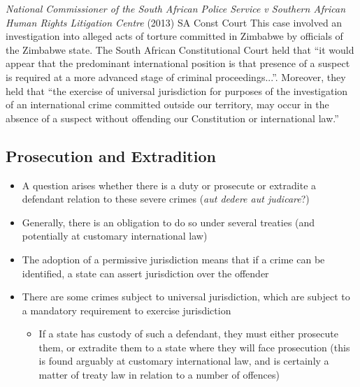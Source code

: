 \begin{casedetails}{\textit{National Commissioner of the South African Police Service v Southern African Human Rights Litigation Centre} (2013) SA Const Court}
    \flushleft
    This case involved an investigation into alleged acts of torture committed in Zimbabwe by officials of the Zimbabwe state. The South African Constitutional Court held that ``it would appear that the predominant international position is that presence of a suspect is required at a more advanced stage of criminal proceedings...''. Moreover, they held that ``the exercise of universal jurisdiction for purposes of the investigation of an international crime committed outside our territory, may occur in the absence of a suspect without offending our Constitution or international law.''
\end{casedetails}

\subsection{Prosecution and Extradition}
\begin{itemize}
    \item A question arises whether there is a duty or prosecute or extradite a defendant relation to these severe crimes (\textit{aut dedere aut judicare}?)
    \item Generally, there is an obligation to do so under several treaties (and potentially at customary international law)
    \item The adoption of a permissive jurisdiction means that if a crime can be identified, a state can assert jurisdiction over the offender
    \item There are some crimes subject to universal jurisdiction, which are subject to a mandatory requirement to exercise jurisdiction
    \begin{itemize}
        \item If a state has custody of such a defendant, they must either prosecute them, or extradite them to a state where they will face prosecution (this is found arguably at customary international law, and is certainly a matter of treaty law in relation to a number of offences)
    \end{itemize}
\end{itemize}

